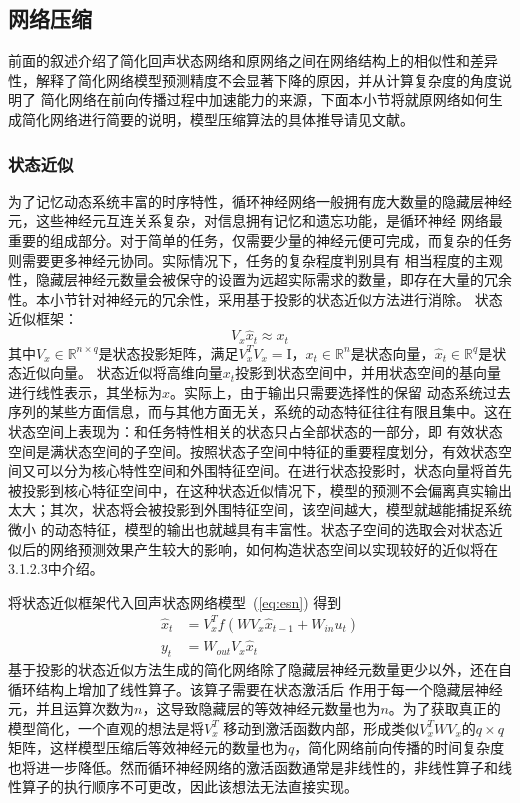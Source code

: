 \subsection{网络压缩}
前面的叙述介绍了简化回声状态网络和原网络之间在网络结构上的相似性和差异性，解释了简化网络模型预测精度不会显著下降的原因，并从计算复杂度的角度说明了
简化网络在前向传播过程中加速能力的来源，下面本小节将就原网络如何生成简化网络进行简要的说明，模型压缩算法的具体推导请见文献。
\subsubsection{状态近似}
为了记忆动态系统丰富的时序特性，循环神经网络一般拥有庞大数量的隐藏层神经元，这些神经元互连关系复杂，对信息拥有记忆和遗忘功能，是循环神经
网络最重要的组成部分。对于简单的任务，仅需要少量的神经元便可完成，而复杂的任务则需要更多神经元协同。实际情况下，任务的复杂程度判别具有
相当程度的主观性，隐藏层神经元数量会被保守的设置为远超实际需求的数量，即存在大量的冗余性。本小节针对神经元的冗余性，采用基于投影的状态近似方法进行消除。
状态近似框架：
\begin{equation}
	V_x \widehat{x}_{t} \approx x_{t}
\end{equation}
其中\(V_x \in \mathbb{R}^{n \times q}\)是状态投影矩阵，满足\(V_x^T  V_x = \mathrm{I}\)，\(x_{t} \in \mathbb{R}^n\)是状态向量，\(\widehat{x}_t \in \mathbb{R}^q\)是状态近似向量。
状态近似将高维向量\(x_t\)投影到状态空间中，并用状态空间的基向量进行线性表示，其坐标为\(\widehat{x}\)。实际上，由于输出只需要选择性的保留
动态系统过去序列的某些方面信息，而与其他方面无关，系统的动态特征往往有限且集中。这在状态空间上表现为：和任务特性相关的状态只占全部状态的一部分，即
有效状态空间是满状态空间的子空间。按照状态子空间中特征的重要程度划分，有效状态空间又可以分为核心特性空间和外围特征空间。在进行状态投影时，状态向量将首先
被投影到核心特征空间中，在这种状态近似情况下，模型的预测不会偏离真实输出太大；其次，状态将会被投影到外围特征空间，该空间越大，模型就越能捕捉系统微小
的动态特征，模型的输出也就越具有丰富性。状态子空间的选取会对状态近似后的网络预测效果产生较大的影响，如何构造状态空间以实现较好的近似将在3.1.2.3中介绍。

将状态近似框架代入回声状态网络模型~(\ref{eq:esn}) 得到
\begin{equation}
	\begin{split}
		\widehat{x}_{t} & = V_x^T  f(W V_x  \widehat{x}_{t-1} + W_{in}  u_t)	\\
					y_t & = W_{out} V_x  \widehat{x}_t
	\end{split}
\end{equation}
基于投影的状态近似方法生成的简化网络除了隐藏层神经元数量更少以外，还在自循环结构上增加了线性算子。该算子需要在状态激活后
作用于每一个隐藏层神经元，并且运算次数为\(n\)，这导致隐藏层的等效神经元数量也为\(n\)。为了获取真正的模型简化，一个直观的想法是将\(V_x^T\)
移动到激活函数内部，形成类似\(V_x^T  W  V_x\)的\(q \times q\)矩阵，这样模型压缩后等效神经元的数量也为\(q\)，简化网络前向传播的时间复杂度
也将进一步降低。然而循环神经网络的激活函数通常是非线性的，非线性算子和线性算子的执行顺序不可更改，因此该想法无法直接实现。


